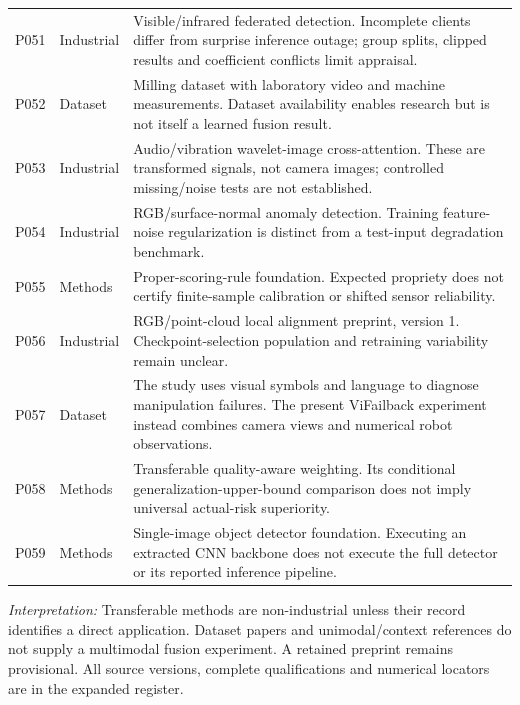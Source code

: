 \begin{longtable}{@{}P{.25\textwidth}P{.16\textwidth}P{.53\textwidth}@{}}
P051 \citep{P051} & Industrial & Visible/infrared federated detection. Incomplete clients differ from surprise inference outage; group splits, clipped results and coefficient conflicts limit appraisal. \\
P052 \citep{Kim2026MSM} & Dataset & Milling dataset with laboratory video and machine measurements. Dataset availability enables research but is not itself a learned fusion result. \\
P053 \citep{P053} & Industrial & Audio/vibration wavelet-image cross-attention. These are transformed signals, not camera images; controlled missing/noise tests are not established. \\
P054 \citep{P054} & Industrial & RGB/surface-normal anomaly detection. Training feature-noise regularization is distinct from a test-input degradation benchmark. \\
P055 \citep{P055} & Methods & Proper-scoring-rule foundation. Expected propriety does not certify finite-sample calibration or shifted sensor reliability. \\
P056 \citep{P056} & Industrial & RGB/point-cloud local alignment preprint, version 1. Checkpoint-selection population and retraining variability remain unclear. \\
P057 \citep{Zeng2026ViFailback} & Dataset & The study uses visual symbols and language to diagnose manipulation failures. The present ViFailback experiment instead combines camera views and numerical robot observations. \\
P058 \citep{Zhang2023QMF} & Methods & Transferable quality-aware weighting. Its conditional generalization-upper-bound comparison does not imply universal actual-risk superiority. \\
P059 \citep{Zhao2024RTDETR} & Methods & Single-image object detector foundation. Executing an extracted CNN backbone does not execute the full detector or its reported inference pipeline. \\
\bottomrule\end{longtable}
\endgroup
\noindent\textit{Interpretation:} Transferable methods are non-industrial unless their record identifies a direct application. Dataset papers and unimodal/context references do not supply a multimodal fusion experiment. A retained preprint remains provisional. All source versions, complete qualifications and numerical locators are in the expanded register.
